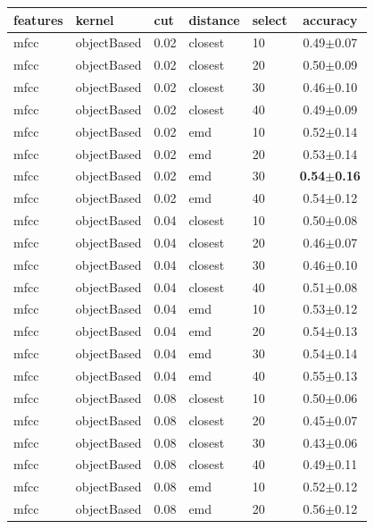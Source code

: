   
 
  
  
\begin{table} 
\begin{center} 
\scriptsize 
 \setlength{\tabcolsep}{.16667em} 
\begin{tabular}{lllllc} 
features & kernel & cut & distance & select & accuracy \\ 
\hline 
mfcc & objectBased & 0.02 & closest & 10 & 0.49$\pm$0.07 \\ 
mfcc & objectBased & 0.02 & closest & 20 & 0.50$\pm$0.09 \\ 
mfcc & objectBased & 0.02 & closest & 30 & 0.46$\pm$0.10 \\ 
mfcc & objectBased & 0.02 & closest & 40 & 0.49$\pm$0.09 \\ 
mfcc & objectBased & 0.02 & emd & 10 & 0.52$\pm$0.14 \\ 
mfcc & objectBased & 0.02 & emd & 20 & 0.53$\pm$0.14 \\ 
mfcc & objectBased & 0.02 & emd & 30 & \textbf{0.54$\pm$0.16} \\ 
mfcc & objectBased & 0.02 & emd & 40 & 0.54$\pm$0.12 \\ 
mfcc & objectBased & 0.04 & closest & 10 & 0.50$\pm$0.08 \\ 
mfcc & objectBased & 0.04 & closest & 20 & 0.46$\pm$0.07 \\ 
mfcc & objectBased & 0.04 & closest & 30 & 0.46$\pm$0.10 \\ 
mfcc & objectBased & 0.04 & closest & 40 & 0.51$\pm$0.08 \\ 
mfcc & objectBased & 0.04 & emd & 10 & 0.53$\pm$0.12 \\ 
mfcc & objectBased & 0.04 & emd & 20 & 0.54$\pm$0.13 \\ 
mfcc & objectBased & 0.04 & emd & 30 & 0.54$\pm$0.14 \\ 
mfcc & objectBased & 0.04 & emd & 40 & 0.55$\pm$0.13 \\ 
mfcc & objectBased & 0.08 & closest & 10 & 0.50$\pm$0.06 \\ 
mfcc & objectBased & 0.08 & closest & 20 & 0.45$\pm$0.07 \\ 
mfcc & objectBased & 0.08 & closest & 30 & 0.43$\pm$0.06 \\ 
mfcc & objectBased & 0.08 & closest & 40 & 0.49$\pm$0.11 \\ 
mfcc & objectBased & 0.08 & emd & 10 & 0.52$\pm$0.12 \\ 
mfcc & objectBased & 0.08 & emd & 20 & 0.56$\pm$0.12 \\ 

\end{tabular}
\end{center}
\end{table}

